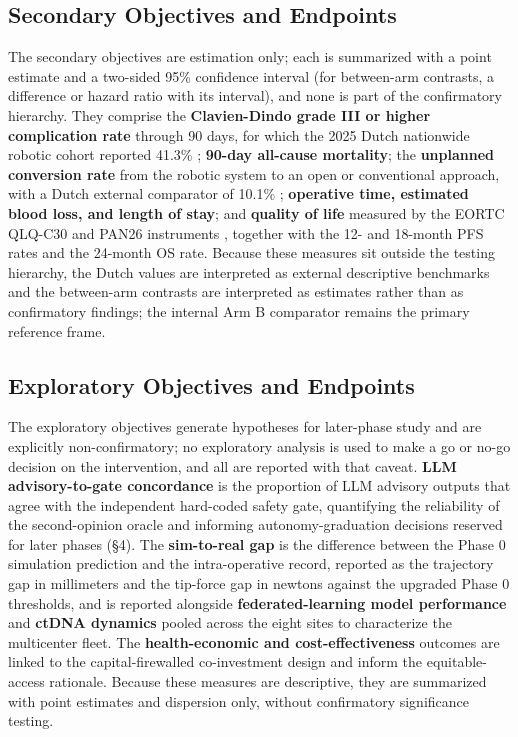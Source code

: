\subsection{Secondary Objectives and Endpoints}

The secondary objectives are estimation only; each is summarized with a point
estimate and a two-sided 95\% confidence interval (for between-arm contrasts, a
difference or hazard ratio with its interval), and none is part of the confirmatory
hierarchy. They comprise the \textbf{Clavien-Dindo grade III or higher
complication rate} through 90 days, for which the 2025 Dutch nationwide robotic
cohort reported 41.3\% \cite{DutchCohort2025}; \textbf{90-day all-cause
mortality}; the \textbf{unplanned conversion rate} from the robotic system to an
open or conventional approach, with a Dutch external comparator of 10.1\%
\cite{DutchCohort2025}; \textbf{operative time, estimated blood loss, and length of
stay}; and \textbf{quality of life} measured by the EORTC QLQ-C30 and PAN26
instruments \cite{EORTCqlqc30}, together with the 12- and 18-month PFS rates and
the 24-month OS rate. Because these measures sit outside the testing hierarchy,
the Dutch values are interpreted as external descriptive benchmarks and the
between-arm contrasts are interpreted as estimates rather than as confirmatory
findings; the internal Arm B comparator remains the primary reference frame.

\subsection{Exploratory Objectives and Endpoints}

The exploratory objectives generate hypotheses for later-phase study and are
explicitly non-confirmatory; no exploratory analysis is used to make a go or no-go
decision on the intervention, and all are reported with that caveat. \textbf{LLM
advisory-to-gate concordance} is the proportion of LLM advisory outputs that agree
with the independent hard-coded safety gate, quantifying the reliability of the
second-opinion oracle and informing autonomy-graduation decisions reserved for
later phases (\S4). The \textbf{sim-to-real gap} is the difference between the
Phase 0 simulation prediction and the intra-operative record, reported as the
trajectory gap in millimeters and the tip-force gap in newtons against the upgraded
Phase 0 thresholds, and is reported alongside \textbf{federated-learning model
performance} and \textbf{ctDNA dynamics} pooled across the eight sites to
characterize the multicenter fleet. The \textbf{health-economic and
cost-effectiveness} outcomes are linked to the capital-firewalled co-investment
design and inform the equitable-access rationale. Because these measures are
descriptive, they are summarized with point estimates and dispersion only, without
confirmatory significance testing.
